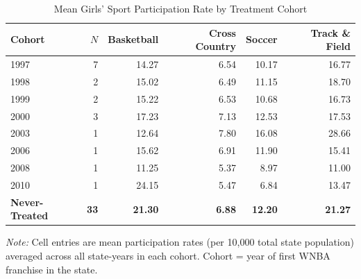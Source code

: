 \begin{table}[!htbp]
\centering
\caption{Mean Girls' Sport Participation Rate by Treatment Cohort}
\label{tab:sumstat_cohort}
\begin{threeparttable}
\fontsize{11}{13}\selectfont
\begin{tabular}{lrrrrr}
\toprule
Cohort & $N$ & Basketball & Cross Country & Soccer & Track \& Field \\
\midrule
1997 & 7 & 14.27 &  6.54 & 10.17 & 16.77 \\
1998 & 2 & 15.02 &  6.49 & 11.15 & 18.70 \\
1999 & 2 & 15.22 &  6.53 & 10.68 & 16.73 \\
2000 & 3 & 17.23 &  7.13 & 12.53 & 17.53 \\
2003 & 1 & 12.64 &  7.80 & 16.08 & 28.66 \\
2006 & 1 & 15.62 &  6.91 & 11.90 & 15.41 \\
2008 & 1 & 11.25 &  5.37 &  8.97 & 11.00 \\
2010 & 1 & 24.15 &  5.47 &  6.84 & 13.47 \\
\midrule
\textbf{Never-Treated} & \textbf{33} & \textbf{21.30} & \textbf{6.88} & \textbf{12.20} & \textbf{21.27} \\
\bottomrule
\end{tabular}
\begin{tablenotes}[flushleft]
\footnotesize
\item \textit{Note:} Cell entries are mean participation rates (per 10,000 total
state population) averaged across all state-years in each cohort.
Cohort = year of first WNBA franchise in the state.
\end{tablenotes}
\end{threeparttable}
\end{table}

